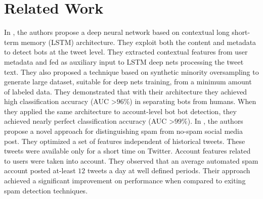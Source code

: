 \section{Related Work}
\label{sec:relatedwork}

In \cite{DeepNeuralNetworks}, the authors propose a deep neural network based on contextual long short-term memory (LSTM) architecture. They exploit both the content and metadata to detect bots at the tweet level. They extracted contextual features from user metadata and fed as auxiliary input  to LSTM deep nets processing the tweet text. They also proposed a technique based on synthetic minority oversampling to generate large dataset, suitable for deep nets training, from a minimum amount of labeled data. They demonstrated that with their architecture they achieved high classification accuracy (AUC \textgreater $96$\%) in separating bots from humans. When they applied the same architecture to account-level bot bot detection, they achieved nearly perfect classification accuracy (AUC \textgreater $99$\%). In \cite{DetectingSpamAccounts}, the authors propose a novel approach for distinguishing spam from no-spam social media post. They optimized a set of features independent of historical tweets. These tweets were available only for a short time on Twitter. Account features related to users were taken into account. They observed that an average automated spam account posted at-least  $12$ tweets a day at well defined periods. Their approach achieved a significant improvement on performance when compared to exiting spam detection techniques.